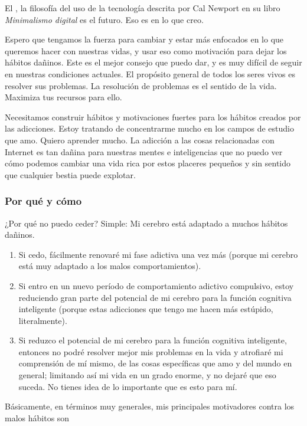 \documentclass[12pt]{article}
\begin{document}
	El , la filosofía del uso de la
	tecnología descrita por Cal Newport en su libro \textit{Minimalismo
	digital} es el futuro. Eso es en lo que creo.

	Espero que tengamos la fuerza para cambiar y estar más enfocados en lo
	que queremos hacer con nuestras vidas, y usar eso como motivación para
	dejar los hábitos dañinos. Este es el mejor consejo que puedo dar, y es
	muy difícil de seguir en nuestras condiciones actuales. El propósito
	general de todos los seres vivos es resolver sus problemas. La
	resolución de problemas es el sentido de la vida. Maximiza tus recursos
	para ello.

	Necesitamos construir hábitos y motivaciones fuertes para
	 los hábitos creados por las adicciones. Estoy
	tratando de concentrarme mucho en los campos de estudio que amo. Quiero
	aprender mucho. La adicción a las cosas relacionadas con Internet es tan
	dañina para nuestras mentes e inteligencias que no puedo ver cómo podemos
	cambiar una vida rica por estos placeres pequeños y sin sentido que
	cualquier bestia puede explotar.

	\subsubsection*{Por qué y cómo}

	¿Por qué no puedo ceder? Simple: Mi cerebro está adaptado a muchos
	hábitos dañinos.

	\begin{enumerate}
	\item Si cedo, fácilmente renovaré mi fase adictiva una vez más (porque
		mi cerebro está muy adaptado a los malos comportamientos).
	\item Si entro en un nuevo período de comportamiento adictivo
	compulsivo, estoy reduciendo gran parte del potencial de mi cerebro para
	la función cognitiva inteligente (porque estas adicciones que tengo me
	hacen más estúpido, literalmente).
	\item Si reduzco el potencial de mi cerebro para la función cognitiva
	inteligente, entonces no podré resolver mejor mis problemas en la vida y
	atrofiaré mi comprensión de mí mismo, de las cosas específicas que amo y
	del mundo en general; limitando así mi vida en un grado enorme, y no
	dejaré que eso suceda. No tienes idea de lo importante que es esto para
	mí.
	\end{enumerate}

	Básicamente, en términos muy generales, mis principales motivadores
	contra los malos hábitos son
\end{document}
